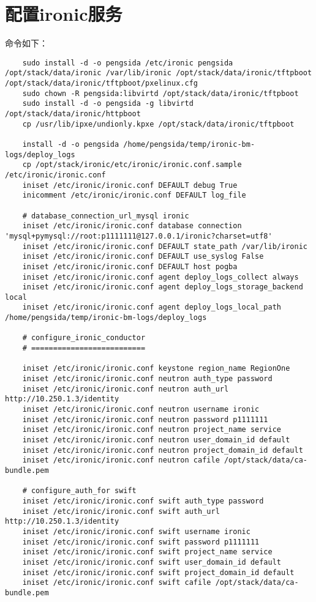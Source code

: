 \documentclass[a4paper,left=1.5cm,right=1.5cm,11pt]{article}
\begin{document}
\section{配置ironic服务}
	命令如下：
	\begin{lstlisting}
	sudo install -d -o pengsida /etc/ironic pengsida /opt/stack/data/ironic /var/lib/ironic /opt/stack/data/ironic/tftpboot /opt/stack/data/ironic/tftpboot/pxelinux.cfg
	sudo chown -R pengsida:libvirtd /opt/stack/data/ironic/tftpboot
	sudo install -d -o pengsida -g libvirtd /opt/stack/data/ironic/httpboot
	cp /usr/lib/ipxe/undionly.kpxe /opt/stack/data/ironic/tftpboot
	
	install -d -o pengsida /home/pengsida/temp/ironic-bm-logs/deploy_logs
	cp /opt/stack/ironic/etc/ironic/ironic.conf.sample /etc/ironic/ironic.conf
	iniset /etc/ironic/ironic.conf DEFAULT debug True
	inicomment /etc/ironic/ironic.conf DEFAULT log_file

	# database_connection_url_mysql ironic
	iniset /etc/ironic/ironic.conf database connection 'mysql+pymysql://root:p1111111@127.0.0.1/ironic?charset=utf8'
	iniset /etc/ironic/ironic.conf DEFAULT state_path /var/lib/ironic
	iniset /etc/ironic/ironic.conf DEFAULT use_syslog False
	iniset /etc/ironic/ironic.conf DEFAULT host pogba
	iniset /etc/ironic/ironic.conf agent deploy_logs_collect always
	iniset /etc/ironic/ironic.conf agent deploy_logs_storage_backend local
	iniset /etc/ironic/ironic.conf agent deploy_logs_local_path /home/pengsida/temp/ironic-bm-logs/deploy_logs

	# configure_ironic_conductor
	# ==========================

	iniset /etc/ironic/ironic.conf keystone region_name RegionOne
	iniset /etc/ironic/ironic.conf neutron auth_type password
	iniset /etc/ironic/ironic.conf neutron auth_url http://10.250.1.3/identity
	iniset /etc/ironic/ironic.conf neutron username ironic
	iniset /etc/ironic/ironic.conf neutron password p1111111
	iniset /etc/ironic/ironic.conf neutron project_name service
	iniset /etc/ironic/ironic.conf neutron user_domain_id default
	iniset /etc/ironic/ironic.conf neutron project_domain_id default
	iniset /etc/ironic/ironic.conf neutron cafile /opt/stack/data/ca-bundle.pem

	# configure_auth_for swift
	iniset /etc/ironic/ironic.conf swift auth_type password
	iniset /etc/ironic/ironic.conf swift auth_url http://10.250.1.3/identity
	iniset /etc/ironic/ironic.conf swift username ironic
	iniset /etc/ironic/ironic.conf swift password p1111111
	iniset /etc/ironic/ironic.conf swift project_name service
	iniset /etc/ironic/ironic.conf swift user_domain_id default
	iniset /etc/ironic/ironic.conf swift project_domain_id default
	iniset /etc/ironic/ironic.conf swift cafile /opt/stack/data/ca-bundle.pem


\end{lstlisting}
\end{document}
